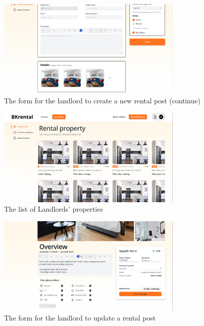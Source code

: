 \begin{figure}[ht]
    \centering
    \includegraphics[width=0.8\textwidth]{Images/Mockup/create_rental_2.png}
    \caption{The form for the landlord to create a new rental post (continue)}
    \label{fig:create-rental-2}
\end{figure}

\clearpage

\begin{figure}[ht]
    \centering
    \includegraphics[width=0.8\textwidth]{Images/Mockup/property_list.png}
    \caption{The list of Landlords' properties}
    \label{fig:property_list}
\end{figure}

\begin{figure}[ht]
    \centering
    \includegraphics[width=0.8\textwidth]{Images/Mockup/update_rental.png}
    \caption{The form for the landlord to update a rental post}
    \label{fig:update_rental}
\end{figure}

